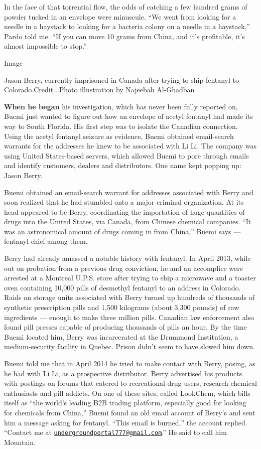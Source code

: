 In the face of that torrential flow, the odds of catching a few hundred
grams of powder tucked in an envelope were minuscule. ``We went from
looking for a needle in a haystack to looking for a bacteria colony on a
needle in a haystack,'' Pardo told me. ``If you can move 10 grams from
China, and it's profitable, it's almost impossible to stop.''

Image

Jason Berry, currently imprisoned in Canada after trying to ship
fentanyl to Colorado.Credit...Photo illustration by Najeebah Al-Ghadban

\textbf{When he began} his investigation, which has never been fully
reported on, Buemi just wanted to figure out how an envelope of acetyl
fentanyl had made its way to South Florida. His first step was to
isolate the Canadian connection. Using the acetyl fentanyl seizure as
evidence, Buemi obtained email-search warrants for the addresses he knew
to be associated with Li Li. The company was using United States-based
servers, which allowed Buemi to pore through emails and identify
customers, dealers and distributors. One name kept popping up: Jason
Berry.

Buemi obtained an email-search warrant for addresses associated with
Berry and soon realized that he had stumbled onto a major criminal
organization. At its head appeared to be Berry, coordinating the
importation of huge quantities of drugs into the United States, via
Canada, from Chinese chemical companies. ``It was an astronomical amount
of drugs coming in from China,'' Buemi says --- fentanyl chief among
them.

Berry had already amassed a notable history with fentanyl. In April
2013, while out on probation from a previous drug conviction, he and an
accomplice were arrested at a Montreal U.P.S. store after trying to ship
a microwave and a toaster oven containing 10,000 pills of desmethyl
fentanyl to an address in Colorado. Raids on storage units associated
with Berry turned up hundreds of thousands of synthetic prescription
pills and 1,500 kilograms (about 3,300 pounds) of raw ingredients ---
enough to make three million pills. Canadian law enforcement also found
pill presses capable of producing thousands of pills an hour. By the
time Buemi located him, Berry was incarcerated at the Drummond
Institution, a medium-security facility in Quebec. Prison didn't seem to
have slowed him down.

Buemi told me that in April 2014 he tried to make contact with Berry,
posing, as he had with Li Li, as a prospective distributor. Berry
advertised his products with postings on forums that catered to
recreational drug users, research-chemical enthusiasts and pill addicts.
On one of these sites, called LookChem, which bills itself as ``the
world's leading B2B trading platform, especially good for looking for
chemicals from China,'' Buemi found an old email account of Berry's and
sent him a message asking for fentanyl. ``This email is burned,'' the
account replied. ``Contact me at
\href{mailto:undergroundportal777@gmail.com}{\nolinkurl{undergroundportal777@gmail.com}}.''
He said to call him Mountain.

